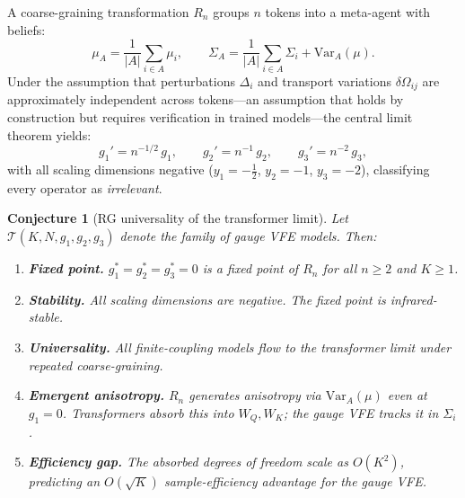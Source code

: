 \documentclass[twoside,11pt]{article}
\newtheorem{conjecture}[theorem]{Conjecture}
\begin{document}
A coarse-graining transformation $R_n$ groups $n$ tokens into a meta-agent with beliefs:
\begin{equation}
\mu_A = \frac{1}{|A|} \sum_{i \in A} \mu_i, \qquad
\Sigma_A = \frac{1}{|A|} \sum_{i \in A} \Sigma_i + \mathrm{Var}_A(\mu).
\label{eq:meta_agent_beliefs}
\end{equation}
Under the assumption that perturbations $\Delta_i$ and transport variations $\delta\Omega_{ij}$ are approximately independent across tokens---an assumption that holds by construction but requires verification in trained models---the central limit theorem yields:
\begin{equation}
g_1' = n^{-1/2}\, g_1, \qquad g_2' = n^{-1}\, g_2, \qquad g_3' = n^{-2}\, g_3,
\label{eq:rg_scaling}
\end{equation}
with all scaling dimensions negative ($y_1 = -\tfrac{1}{2}$, $y_2 = -1$, $y_3 = -2$), classifying every operator as \emph{irrelevant}.

\begin{conjecture}[RG universality of the transformer limit]
\label{conj:rg_universality}
Let $\mathcal{T}(K, N, g_1, g_2, g_3)$ denote the family of gauge VFE models. Then:
\begin{enumerate}
\item[(i)] \textbf{Fixed point.} $g_1^* = g_2^* = g_3^* = 0$ is a fixed point of $R_n$ for all $n \geq 2$ and $K \geq 1$.
\item[(ii)] \textbf{Stability.} All scaling dimensions are negative.  The fixed point is infrared-stable.
\item[(iii)] \textbf{Universality.} All finite-coupling models flow to the transformer limit under repeated coarse-graining.
\item[(iv)] \textbf{Emergent anisotropy.} $R_n$ generates anisotropy via $\mathrm{Var}_A(\mu)$ even at $g_1 = 0$. Transformers absorb this into $W_Q, W_K$; the gauge VFE tracks it in $\Sigma_i$.
\item[(v)] \textbf{Efficiency gap.} The absorbed degrees of freedom scale as $O(K^2)$, predicting an $O(\sqrt{K})$ sample-efficiency advantage for the gauge VFE.
\end{enumerate}
\end{conjecture}
\end{document}
